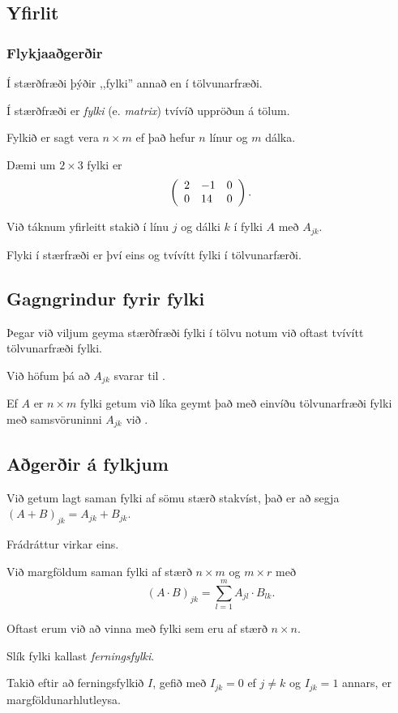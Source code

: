 \subsection{Yfirlit}
{
    \frametitle{Flykjaaðgerðir}
    {
        \item<1-> Í stærðfræði þýðir ,,fylki'' annað en í tölvunarfræði.
        \item<2-> Í stærðfræði er \emph{fylki} (e. \emph{matrix}) tvívíð uppröðun á tölum.
        \item<3-> Fylkið er sagt vera $n \times m$ ef það hefur $n$ línur og $m$ dálka.
        \item<4-> Dæmi um $2 \times 3$ fylki er
        \[
            \left (
            \env{array}
            { {l l l}
                2 & -1 & 0\\
                0 & 14 & 0
            }
            \right ).
        \]
        \item<5-> Við táknum yfirleitt stakið í línu $j$ og dálki $k$ í fylki $A$ með $A_{jk}$.
        \item<6-> Flyki í stærfræði er því eins og tvívítt fylki í tölvunarfærði.
    }
}

\subsection{Gagngrindur fyrir fylki}
{
    {
        \item<1-> Þegar við viljum geyma stærðfræði fylki í tölvu notum við oftast tvívítt tölvunarfræði fylki.
        \item<2-> Við höfum þá að $A_{jk}$ svarar til .
        \item<3-> Ef $A$ er $n \times m$ fylki getum við líka geymt það með einvíðu tölvunarfræði fylki með samsvöruninni $A_{jk}$ við
                    .
    }
}

\subsection{Aðgerðir á fylkjum}
{
    {
        \item<1-> Við getum lagt saman fylki af sömu stærð stakvíst, það er að segja $(A + B)_{jk} = A_{jk} + B_{jk}$.
        \item<2-> Frádráttur virkar eins.
        \item<3-> Við margföldum saman fylki af stærð $n \times m$ og $m \times r$ með
        \[
            (A \cdot B)_{jk} = \sum_{l = 1}^m A_{jl} \cdot B_{lk}.
        \]
        \item<4-> Oftast erum við að vinna með fylki sem eru af stærð $n \times n$.
        \item<5-> Slík fylki kallast \emph{ferningsfylki}.
        \item<6-> Takið eftir að ferningsfylkið $I$, gefið með $I_{jk} = 0$ ef $j \neq k$ og $I_{jk} = 1$ annars, er margföldunarhlutleysa.
    }
}

